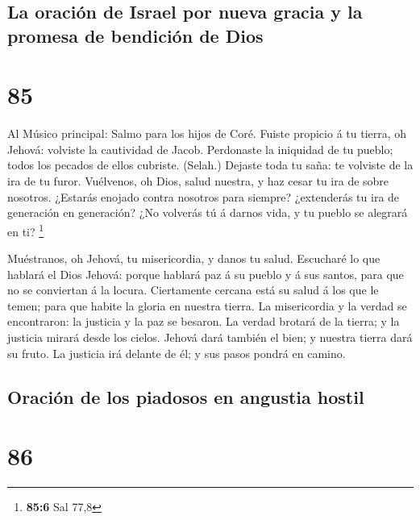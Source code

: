 \hypertarget{la-oraciuxf3n-de-israel-por-nueva-gracia-y-la-promesa-de-bendiciuxf3n-de-dios}{%
\subsection{La oración de Israel por nueva gracia y la promesa de
bendición de
Dios}\label{la-oraciuxf3n-de-israel-por-nueva-gracia-y-la-promesa-de-bendiciuxf3n-de-dios}}

\hypertarget{section-84}{%
\section{85}\label{section-84}}

 Al Músico principal: Salmo para los hijos de Coré. Fuiste
propicio á tu tierra, oh Jehová: volviste la cautividad de Jacob.
 Perdonaste la iniquidad de tu pueblo; todos los pecados de
ellos cubriste. (Selah.)  Dejaste toda tu saña: te volviste
de la ira de tu furor.  Vuélvenos, oh Dios, salud nuestra, y
haz cesar tu ira de sobre nosotros.  ¿Estarás enojado contra
nosotros para siempre? ¿extenderás tu ira de generación en generación?
 ¿No volverás tú á darnos vida, y tu pueblo se alegrará en
ti? \footnote{\textbf{85:6} Sal 77,8}

 Muéstranos, oh Jehová, tu misericordia, y danos tu salud.
 Escucharé lo que hablará el Dios Jehová: porque hablará paz
á su pueblo y á sus santos, para que no se conviertan á la locura.
 Ciertamente cercana está su salud á los que le temen; para
que habite la gloria en nuestra tierra.  La misericordia y
la verdad se encontraron: la justicia y la paz se besaron. 
La verdad brotará de la tierra; y la justicia mirará desde los cielos.
 Jehová dará también el bien; y nuestra tierra dará su
fruto.  La justicia irá delante de él; y sus pasos pondrá
en camino.

\hypertarget{oraciuxf3n-de-los-piadosos-en-angustia-hostil}{%
\subsection{Oración de los piadosos en angustia
hostil}\label{oraciuxf3n-de-los-piadosos-en-angustia-hostil}}

\hypertarget{section-85}{%
\section{86}\label{section-85}}

